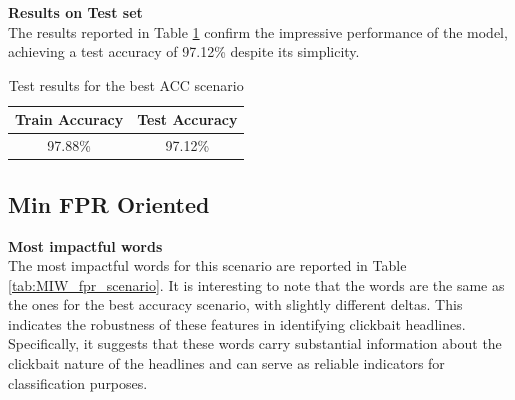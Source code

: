 \documentclass{article}
\begin{document}
\begin{multicols}{2}
\noindent
\textbf{Results on Test set}\\
The results reported in Table \ref{tab:test_acc_scenario} confirm the impressive performance of the model,
achieving a test accuracy of 97.12\% despite its simplicity.

    \begin{table}[H]
        \small
        \centering
        \begin{tabular}{|c|c|}
        \hline
        \rowcolor{pyblue!60}
        \textbf{Train Accuracy} & \textbf{Test Accuracy} \\ \hline
        97.88\% & 97.12\% \\ \hline
        \end{tabular}
        \caption{\footnotesize Test results for the best ACC scenario}
        \label{tab:test_acc_scenario}
    \end{table}



\subsection{Min FPR Oriented}

\textbf{Most impactful words}\\
The most impactful words for this scenario are reported in Table \ref{tab:MIW_fpr_scenario}. It is interesting to note that the words
are the same as the ones for the best accuracy scenario, with slightly different deltas. 
This indicates the robustness of these features in identifying clickbait headlines. 
Specifically, it suggests that these words carry substantial information about the clickbait 
nature of the headlines and can serve as reliable indicators for classification purposes.

\begin{table}[H]
    \small
    \centering
    

\end{table}
\end{multicols}
\end{document}
